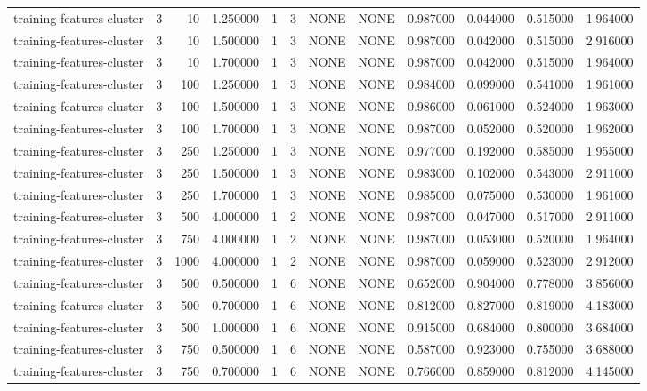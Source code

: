 \begin{tabular}{lrrrllllrrrr}
training-features-cluster & 3 & 10 & 1.250000 & 1 & 3 & NONE & NONE & 0.987000 & 0.044000 & 0.515000 & 1.964000 \\
training-features-cluster & 3 & 10 & 1.500000 & 1 & 3 & NONE & NONE & 0.987000 & 0.042000 & 0.515000 & 2.916000 \\
training-features-cluster & 3 & 10 & 1.700000 & 1 & 3 & NONE & NONE & 0.987000 & 0.042000 & 0.515000 & 1.964000 \\
training-features-cluster & 3 & 100 & 1.250000 & 1 & 3 & NONE & NONE & 0.984000 & 0.099000 & 0.541000 & 1.961000 \\
training-features-cluster & 3 & 100 & 1.500000 & 1 & 3 & NONE & NONE & 0.986000 & 0.061000 & 0.524000 & 1.963000 \\
training-features-cluster & 3 & 100 & 1.700000 & 1 & 3 & NONE & NONE & 0.987000 & 0.052000 & 0.520000 & 1.962000 \\
training-features-cluster & 3 & 250 & 1.250000 & 1 & 3 & NONE & NONE & 0.977000 & 0.192000 & 0.585000 & 1.955000 \\
training-features-cluster & 3 & 250 & 1.500000 & 1 & 3 & NONE & NONE & 0.983000 & 0.102000 & 0.543000 & 2.911000 \\
training-features-cluster & 3 & 250 & 1.700000 & 1 & 3 & NONE & NONE & 0.985000 & 0.075000 & 0.530000 & 1.961000 \\
training-features-cluster & 3 & 500 & 4.000000 & 1 & 2 & NONE & NONE & 0.987000 & 0.047000 & 0.517000 & 2.911000 \\
training-features-cluster & 3 & 750 & 4.000000 & 1 & 2 & NONE & NONE & 0.987000 & 0.053000 & 0.520000 & 1.964000 \\
training-features-cluster & 3 & 1000 & 4.000000 & 1 & 2 & NONE & NONE & 0.987000 & 0.059000 & 0.523000 & 2.912000 \\
training-features-cluster & 3 & 500 & 0.500000 & 1 & 6 & NONE & NONE & 0.652000 & 0.904000 & 0.778000 & 3.856000 \\
training-features-cluster & 3 & 500 & 0.700000 & 1 & 6 & NONE & NONE & 0.812000 & 0.827000 & 0.819000 & 4.183000 \\
training-features-cluster & 3 & 500 & 1.000000 & 1 & 6 & NONE & NONE & 0.915000 & 0.684000 & 0.800000 & 3.684000 \\
training-features-cluster & 3 & 750 & 0.500000 & 1 & 6 & NONE & NONE & 0.587000 & 0.923000 & 0.755000 & 3.688000 \\
training-features-cluster & 3 & 750 & 0.700000 & 1 & 6 & NONE & NONE & 0.766000 & 0.859000 & 0.812000 & 4.145000 \\

\end{tabular}
